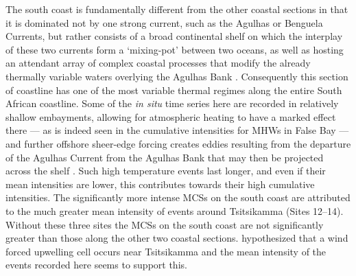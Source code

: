\documentclass[a4paper,10pt,review]{elsarticle}
\begin{document}
The south coast is fundamentally different from the other coastal sections in that it is dominated not by one strong current, such as the Agulhas or Benguela Currents, but rather consists of a broad continental shelf on which the interplay of these two currents form a `mixing-pot' between two oceans, as well as hosting an attendant array of complex coastal processes that modify the already thermally variable waters overlying the Agulhas Bank \citep{Lutjeharms2003, Roberts2005, Hutchings2009}. Consequently this section of coastline has one of the most variable thermal regimes along the entire South African coastline. Some of the \emph{in situ} time series here are recorded in relatively shallow embayments, allowing for atmospheric heating to have a marked effect there --- as is indeed seen in the cumulative intensities for MHWs in False Bay --- and further offshore sheer-edge forcing creates eddies resulting from the departure of the Agulhas Current from the Agulhas Bank that may then be projected across the shelf \citep{Lutjeharms2003}. Such high temperature events last longer, and even if their mean intensities are lower, this contributes towards their high cumulative intensities. The significantly more intense MCSs on the south coast are attributed to the much greater mean intensity of events around Tsitsikamma (Sites 12--14). Without these three sites the MCSs on the south coast are not significantly greater than those along the other two coastal sections. \citep{Roberts2005} hypothesized that a wind forced upwelling cell occurs near Tsitsikamma and the mean intensity of the events recorded here seems to support this.
\end{document}
